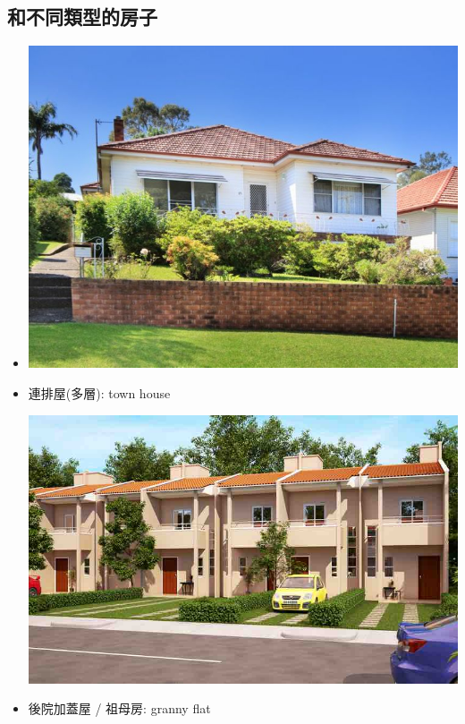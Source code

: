 \subsection{和不同類型的房子}
\begin{multicols}{2}
\begin{itemize}
  \itemsep0em
  \item {}
  \begin{center}
    \includegraphics[scale=0.3]{pics/house}
  \end{center}
  \item 連排屋(多層): town house
  \begin{center}
    \includegraphics[scale=0.2]{pics/townhouse}
  \end{center}
  \item 後院加蓋屋 / 祖母房: granny flat
  \begin{center}

\end{center}
\end{itemize}
\end{multicols}
